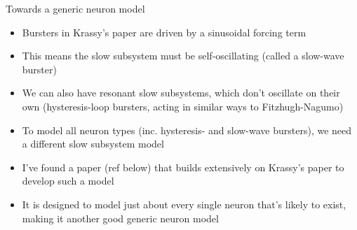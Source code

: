 \documentclass[,aspectratio=169]{beamer}
\begin{document}
\begin{frame}[label={sec:org2cd7675}]{Towards a generic neuron model}
\begin{itemize}[<+->]
\item Bursters in Krassy's paper are driven by a sinusoidal forcing term
\item This means the slow subsystem must be self-oscillating (called a slow-wave burster)
\item We can also have resonant slow subsystems, which don't oscillate on their own (hysteresis-loop bursters, acting in similar ways to Fitzhugh-Nagumo)
\item To model all neuron types (inc. hysteresis- and slow-wave bursters), we need a different slow subsystem model
\item I've found a paper (ref below) that builds extensively on Krassy's paper to develop such a model
\item It is designed to model just about every single neuron that's likely to exist, making it another good generic neuron model
\end{itemize}
\end{frame}
\end{document}
